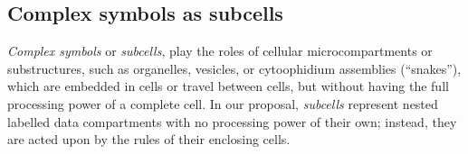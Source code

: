 \subsection{Complex symbols as subcells}

\emph{Complex symbols} or \emph{subcells}, 
play the roles of cellular microcompartments or substructures,
such as organelles, vesicles, or cytoophidium assemblies (``snakes''),
which are embedded in cells or travel between cells, 
but without having the full processing power of a complete cell.
In our proposal, \emph{subcells} represent nested labelled data compartments
with no processing power of their own;
instead, they are acted upon by the rules of their enclosing cells.




